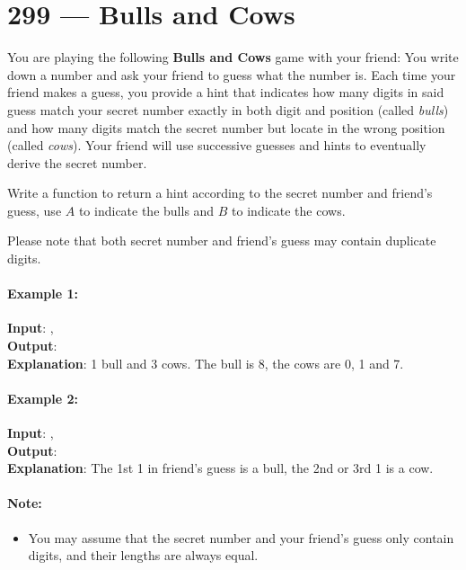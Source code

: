\section{299 --- Bulls and Cows}
You are playing the following \textbf{Bulls and Cows} game with your friend: You write down a number and ask your friend to guess what the number is. Each time your friend makes a guess, you provide a hint that indicates how many digits in said guess match your secret number exactly in both digit and position (called \textit{bulls}) and how many digits match the secret number but locate in the wrong position (called \textit{cows}). Your friend will use successive guesses and hints to eventually derive the secret number.

Write a function to return a hint according to the secret number and friend's guess, use $A$ to indicate the bulls and $B$ to indicate the cows. 

Please note that both secret number and friend's guess may contain duplicate digits.

\paragraph{Example 1:}

\begin{flushleft}
\textbf{Input}: ,
\\
\textbf{Output}: 
\\
\textbf{Explanation}: 1 bull and 3 cows. The bull is 8, the cows are 0, 1 and 7.
\end{flushleft}

\paragraph{Example 2:}

\begin{flushleft}
\textbf{Input}: , 
\\
\textbf{Output}: 
\\
\textbf{Explanation}: The 1st 1 in friend's guess is a bull, the 2nd or 3rd 1 is a cow.
\end{flushleft}

\paragraph{Note:} 
\begin{itemize}
\item You may assume that the secret number and your friend's guess only contain digits, and their lengths are always equal.
\end{itemize}
